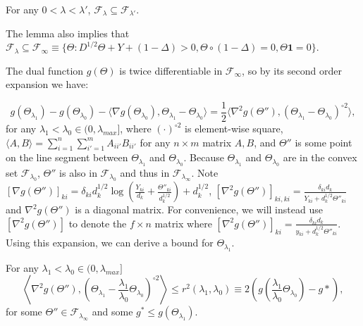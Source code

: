 \begin{lemma}
    \label{lem:1}
    For any $0<\lambda<\lambda'$, $\mathcal{F}_{\lambda}\subseteq\mathcal{F}_{\lambda'}$.
\end{lemma}

The lemma also implies that $\mathcal{F}_{\lambda}\subseteq\mathcal{F}_{\infty}\equiv\{\Theta: D^{1/2}\Theta+Y+(1-\Delta)> 0,\Theta\circ(1-\Delta)=0, \Theta\mathbf{1}=0\}$.

The dual function $g(\Theta)$ is twice differentiable in $\mathcal{F}_{\infty}$, so by its second order expansion we have:

\begin{equation}
        \label{eq:expand}
        g(\Theta_{\lambda_1})-g(\Theta_{\lambda_{0}})-\langle\nabla g(\Theta_{\lambda_{0}}),\Theta_{\lambda_{1}}-\Theta_{\lambda_{0}}\rangle=\frac{1}{2}\langle\nabla^2 g(\Theta''),(\Theta_{\lambda_{1}}-\Theta_{\lambda_{0}})^{\circ 2}\rangle,%
\end{equation}
for any $\lambda_1<\lambda_{0}\in (0,\lambda_{max}]$, where $(\cdot)^{\circ2}$ is element-wise square, $\langle A,B\rangle=\sum_{i=1}^n\sum_{i'=1}^mA_{ii'}B_{ii'}$ for any $n\times m$ matrix $A,B$, and $\Theta''$ is some point on the line segment between $\Theta_{\lambda_{1}}$ and $\Theta_{\lambda_{0}}$. Because $\Theta_{\lambda_{1}}$ and $\Theta_{\lambda_{0}}$ are in the convex set $\mathcal{F}_{\lambda_{0}}$, $\Theta''$ is also in $\mathcal{F}_{\lambda_{0}}$ and thus in $\mathcal{F}_{\lambda_{\infty}}$. Note $[\nabla g(\Theta'')]_{ki}=\delta_{ki}d_k^{1/2}\log\left(\frac{Y_{ki}}{d_k}+\frac{\Theta''_{ki}}{d_k^{1/2}}\right)+d_k^{1/2}$, $[\nabla^2 g(\Theta'')]_{ki,ki}=\frac{\delta_{ki}d_k}{Y_{ki}+d_k^{1/2}\Theta''_{ki}}$ and $\nabla^2 g(\Theta'')$ is a diagonal matrix. For convenience, we will instead use $[\nabla^2 g(\Theta'')]$ to denote the $f\times n$ matrix where $[\nabla^2 g(\Theta'')]_{ki}=\frac{\delta_{ki}d_k}{y_{ki}+d_k^{1/2}\Theta''_{ki}}$. Using this expansion, we can derive a bound for $\Theta_{\lambda_1}$.



\begin{theorem}
    \label{thm:1}
    For any $\lambda_1<\lambda_{0}\in (0,\lambda_{max}]$ 
    \begin{equation}
        \left\langle\nabla^2 g(\Theta''),\left(\Theta_{\lambda_1}-\frac{\lambda_1}{\lambda_0}\Theta_{\lambda_0}\right)^{\circ 2}\right\rangle\leq r^2(\lambda_1,\lambda_0)\equiv 2\left(g\left(\frac{\lambda_1}{\lambda_0}\Theta_{\lambda_0}\right)-g*\right),
    \end{equation}
    for some $\Theta''\in\mathcal{F}_{\lambda_{\infty}}$ and some $g^*\leq g(\Theta_{\lambda_1})$.
\end{theorem}

